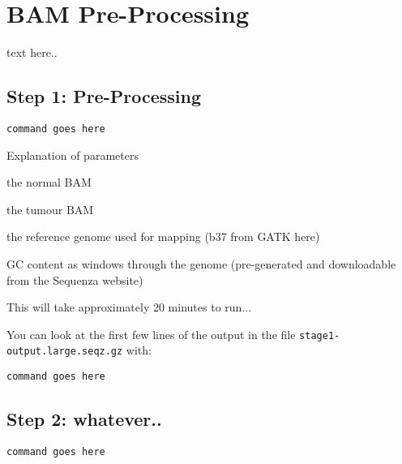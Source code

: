 \section{BAM Pre-Processing}

text here..

\subsection{Step 1: Pre-Processing}

\begin{steps}
\begin{lstlisting}
command goes here
\end{lstlisting}
\end{steps}

\begin{note}
Explanation of parameters
\begin{description}[style=multiline,labelindent=0cm,align=right,leftmargin=\descriptionlabelspace,rightmargin=1.5cm,font=\ttfamily]
 \item[-n] the normal BAM
 \item[-t] the tumour BAM
 \item[--fasta] the reference genome used for mapping (b37 from GATK here)
 \item[-gc] GC content as windows through the genome (pre-generated and downloadable from the Sequenza website)
\end{description}
\end{note}

This will take approximately 20 minutes to run...

\begin{information}
You can look at the first few lines of the output in the file \texttt{stage1-output.large.seqz.gz} with:
 
\begin{lstlisting}
command goes here
\end{lstlisting}
\end{information}


\subsection{Step 2: whatever..}

\begin{steps}
\begin{lstlisting}
command goes here
\end{lstlisting}
\end{steps}

